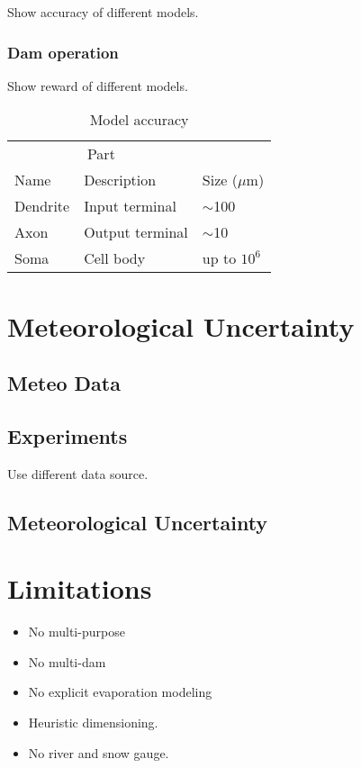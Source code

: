 \documentclass{article}
\begin{document}
Show accuracy of different models.

\subsubsection{Dam operation}

Show reward of different models.

\begin{table}
	\caption{Model accuracy}
	\centering
	\begin{tabular}{lll}
		\toprule
		\multicolumn{2}{c}{Part}                   \\
		\cmidrule(r){1-2}
		Name     & Description     & Size ($\mu$m) \\
		\midrule
		Dendrite & Input terminal  & $\sim$100     \\
		Axon     & Output terminal & $\sim$10      \\
		Soma     & Cell body       & up to $10^6$  \\
		\bottomrule
	\end{tabular}
	\label{tab:table}
\end{table}

\section{Meteorological Uncertainty}
\label{sec:Meteorological Uncertainty}

\subsection{Meteo Data}
\label{sec:Meteo Data}

\subsection{Experiments}
\label{sec:Meteo Experiments}

Use different data source.


\subsection{Meteorological Uncertainty}

\section{Limitations}

\begin{itemize}
	\item No multi-purpose
	\item No multi-dam
 	\item No explicit evaporation modeling
	\item Heuristic dimensioning.
	\item No river and snow gauge.  
\end{itemize}
\end{document}
